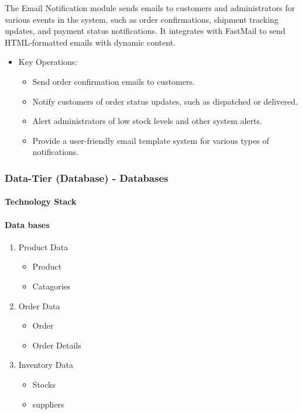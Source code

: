 \documentclass{llncs}
\begin{document}
The Email Notification module sends emails to customers and administrators for various events in the system, such as order confirmations, shipment tracking updates, and payment status notifications. It integrates with FastMail to send HTML-formatted emails with dynamic content.
\begin{itemize}
    \item Key Operations:
    \begin{itemize}   
        \item Send order confirmation emails to customers.
        \item Notify customers of order status updates, such as dispatched or delivered.
        \item Alert administrators of low stock levels and other system alerts.
        \item Provide a user-friendly email template system for various types of notifications.
    \end{itemize}   
\end{itemize}

\subsubsection{Data-Tier (Database) - Databases}
\paragraph{Technology Stack}
\paragraph{Data bases}
\begin{enumerate}
    \item Product Data
    \begin{itemize}
        \item Product
        \item Catagories
        \end{itemize}
    \item Order Data
    \begin{itemize}
        \item Order 
        \item Order Details
        \end{itemize}
    \item Inventory Data
    \begin{itemize}
        \item Stocks 
        \item suppliers
        \end{itemize}
 
\end{enumerate}
\end{document}
